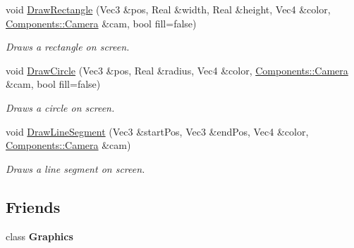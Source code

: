 \begin{DoxyCompactItemize}
\item 
void \hyperlink{classDCEngine_1_1Systems_1_1GraphicsGL_a2dc7dd32141a9a89aa3430387399cc16}{Draw\-Rectangle} (Vec3 \&pos, Real \&width, Real \&height, Vec4 \&color, \hyperlink{classDCEngine_1_1Components_1_1Camera}{Components\-::\-Camera} \&cam, bool fill=false)
\begin{DoxyCompactList}\small\item\em Draws a rectangle on screen. \end{DoxyCompactList}\item 
void \hyperlink{classDCEngine_1_1Systems_1_1GraphicsGL_a545d24e11bee7f002b490b46b4ee46f2}{Draw\-Circle} (Vec3 \&pos, Real \&radius, Vec4 \&color, \hyperlink{classDCEngine_1_1Components_1_1Camera}{Components\-::\-Camera} \&cam, bool fill=false)
\begin{DoxyCompactList}\small\item\em Draws a circle on screen. \end{DoxyCompactList}\item 
void \hyperlink{classDCEngine_1_1Systems_1_1GraphicsGL_a2c49099c6b0dcf7b2c4ededfcea7f259}{Draw\-Line\-Segment} (Vec3 \&start\-Pos, Vec3 \&end\-Pos, Vec4 \&color, \hyperlink{classDCEngine_1_1Components_1_1Camera}{Components\-::\-Camera} \&cam)
\begin{DoxyCompactList}\small\item\em Draws a line segment on screen. \end{DoxyCompactList}\end{DoxyCompactItemize}
\subsection*{Friends}
\begin{DoxyCompactItemize}
\item 
\hypertarget{classDCEngine_1_1Systems_1_1GraphicsGL_ae5cfe0c0e0b06d536d5814bd1ff4818f}{class {\bfseries Graphics}}\label{classDCEngine_1_1Systems_1_1GraphicsGL_ae5cfe0c0e0b06d536d5814bd1ff4818f}

\end{DoxyCompactItemize}


